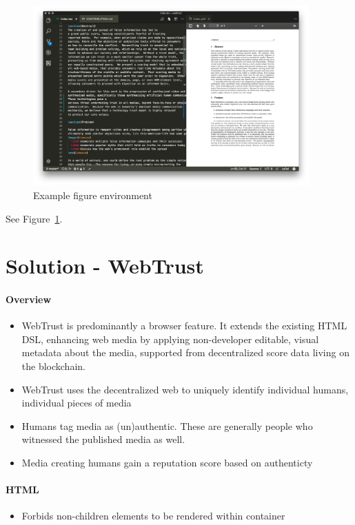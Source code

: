 \documentclass{paper}
\begin{document}
\begin{figure}[h]
  \centering
  \includegraphics[width=400px]{img/latexworkshop.png}
  \caption{Example figure environment}%
  \label{figenv}
  \end{figure}
  See Figure~\ref{figenv}.

\section{Solution - WebTrust}

\paragraph{Overview}
\begin{itemize}
  \item WebTrust is predominantly a browser feature.  It
  extends the existing HTML DSL, enhancing web media by applying non-developer
  editable, visual metadata about the media, supported from decentralized score
  data living on the blockchain.
  \item WebTrust uses the decentralized web to uniquely identify individual humans, individual pieces of media
  \item Humans tag media as (un)authentic.  These are generally people who witnessed the published media as well.
  \item Media creating humans gain a reputation score based on authenticty
\end{itemize}

\paragraph{HTML}
\begin{itemize}
  \item Forbids non-children elements to be rendered within container
\end{itemize}
\end{document}
